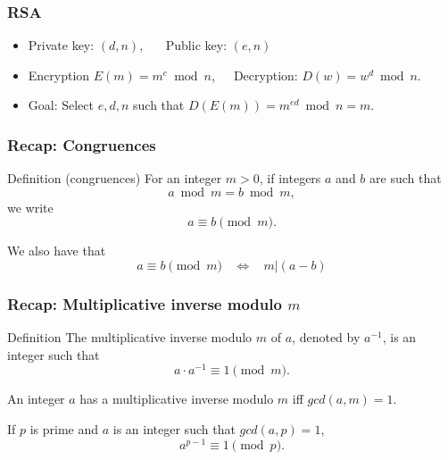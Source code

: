 

\begin{frame}
  \frametitle{RSA}

  \begin{tcolorbox}
  {\footnotesize
  \begin{itemize}
  \item Private key: $(d,n)$, \ \ \  Public key: $(e,n)$
  \item Encryption $E(m) = m^{e} \bmod n$,\ \ \  Decryption: $D(w) = w^{d} \bmod n$.
  \item Goal: Select $e,d,n$ such that $D(E(m)) = m^{ed}\bmod n = m$.
  \end{itemize}
  }
  \end{tcolorbox}
  \vspace{2in}
\end{frame}

\begin{frame}
  \frametitle{Recap: Congruences}

  \begin{block}{Definition (congruences)}
    For an integer $m>0$,
    if integers $a$ and $b$ are such that
    \[
    a \bmod m = b \bmod m,
    \]
    we write
    \[
    a \equiv b \pmod m.
    \]
  \end{block}

  We also have that
  \[
  a \equiv b \pmod m \ \ \ \ \Leftrightarrow \ \ \ \
  m|(a-b)
  \]
\end{frame}

\begin{frame}
  \frametitle{Recap: Multiplicative inverse modulo $m$}

  \begin{block}{Definition}
    The multiplicative inverse modulo $m$ of $a$, denoted by $a^{-1}$,
    is an integer such that
    \[
    a\cdot a^{-1}\equiv 1 \pmod m.
    \]
  \end{block}
  \vspace{0.2in}
  \begin{theorem}
    An integer $a$ has a multiplicative inverse modulo $m$ iff
    $gcd(a,m) = 1$.
  \end{theorem}
\end{frame}

\begin{frame}
  \begin{theorem}
    If $p$ is prime and $a$ is an integer such that $gcd(a,p)=1$,
    \[
    a^{p-1}\equiv 1 \pmod p.
    \]
  \end{theorem}

\end{frame}

